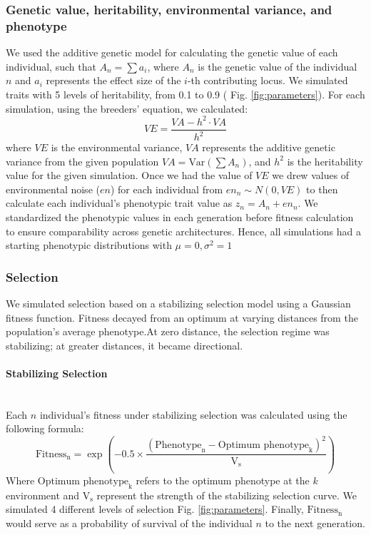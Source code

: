 \documentclass{article}
\let\oldparagraph\paragraph
\renewcommand{\paragraph}[1]{\oldparagraph{#1}\mbox{}\\}
\begin{document}
\subsubsection{Genetic value, heritability, environmental variance, and phenotype}
We used the additive genetic model for calculating the genetic value of each individual, such that $A_n=\sum a_i$, where $A_n$ is the genetic value of the individual $n$ and \( a_i \) represents the effect size of the \( i \)-th contributing locus. We simulated traits with 5 levels of heritability, from 0.1 to 0.9 ( Fig. \ref{fig:parameters}). For each simulation, using the breeders' equation, we calculated:
\[
VE = \frac{VA - h^2 \cdot VA}{h^2}
\]
where \( VE \) is the environmental variance, \(VA\) represents the additive genetic variance from the given population \( VA = \text{Var}\left(\sum A_n\right) \), and \( h^2 \) is the heritability value for the given simulation. Once we had the value of \( VE \) we drew values of environmental noise (\( en \)) for each individual from \( en_n \sim N(0, VE) \) to then calculate each individual's phenotypic trait value as \( z_n = A_n+ en_n \). We standardized the phenotypic values in each generation before fitness calculation to ensure comparability across genetic architectures. Hence, all simulations had a starting phenotypic distributions with $\mu = 0, \sigma^2 = 1$

\subsubsection{Selection}
We simulated selection based on a stabilizing selection model using a Gaussian fitness function. Fitness decayed from an optimum at varying distances from the population's average phenotype.At zero distance, the selection regime was stabilizing; at greater distances, it became directional.

\paragraph{Stabilizing Selection}
Each $n$ individual's fitness under stabilizing selection was calculated using the following formula:
\[
\text{Fitness}_\text{n} = \exp\left(-0.5 \times \frac{(\text{Phenotype}_\text{n} - {\text{Optimum phenotype}_\text{k}})^2}{\text{V}_\text{s}}\right)
\]
Where $\text{Optimum phenotype}_\text{k}$ refers to the optimum phenotype at the $k$ environment and $\text{V}_\text{s}$ represent the strength of the stabilizing selection curve. We simulated 4 different levels of selection Fig. \ref{fig:parameters}. Finally, $\text{Fitness}_\text{n}$ would serve as a probability of survival of the individual $n$ to the next generation.
\end{document}
